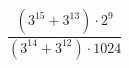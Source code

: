 \begin{ex}[type=calculate]
	\begin{condition}
		\( \dfrac{(3^{15}+3^{13})\cdot2^9}{(3^{14}+3^{12})\cdot1024} \)
	\end{condition}
\end{ex}